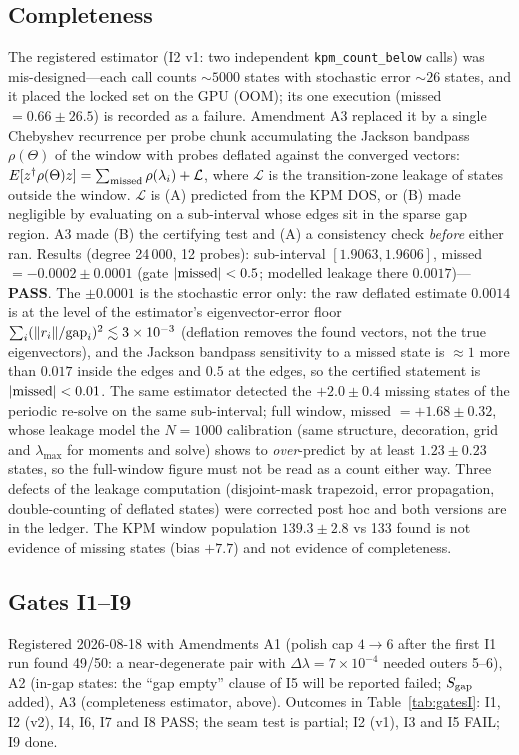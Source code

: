 \documentclass[aps,prl,preprint,superscriptaddress,longbibliography,nofootinbib]{revtex4-2}
\begin{document}
\subsection{Completeness}\label{sec:complete}
The registered estimator (I2 v1: two independent \texttt{kpm\_count\_below} calls) was mis-designed---each call counts $\sim5000$ states with stochastic error $\sim26$ states, and it placed the locked set on the GPU (OOM); its one execution (missed $=0.66\pm26.5$) is recorded as a failure. Amendment A3 replaced it by a single Chebyshev recurrence per probe chunk accumulating the Jackson bandpass $\rho(\Theta)$ of the window with probes deflated against the converged vectors: $E[z^\dagger\rho(\Theta)z]=\sum_{\rm missed}\rho(\lambda_i)+\mathcal L$, where $\mathcal L$ is the transition-zone leakage of states outside the window. $\mathcal L$ is (A) predicted from the KPM DOS, or (B) made negligible by evaluating on a sub-interval whose edges sit in the sparse gap region. A3 made (B) the certifying test and (A) a consistency check \emph{before} either ran. Results (degree 24\,000, 12 probes): sub-interval $[1.9063,1.9606]$, missed $=-0.0002\pm0.0001$ (gate $|{\rm missed}|<0.5$; modelled leakage there $0.0017$)---\textbf{PASS}. The $\pm0.0001$ is the stochastic error only: the raw deflated estimate $0.0014$ is at the level of the estimator's eigenvector-error floor $\sum_i(\|r_i\|/{\rm gap}_i)^2\lesssim3\times10^{-3}$ (deflation removes the found vectors, not the true eigenvectors), and the Jackson bandpass sensitivity to a missed state is $\approx1$ more than $0.017$ inside the edges and $0.5$ at the edges, so the certified statement is $|{\rm missed}|<0.01$. The same estimator detected the $+2.0\pm0.4$ missing states of the periodic re-solve on the same sub-interval; full window, missed $=+1.68\pm0.32$, whose leakage model the $N=1000$ calibration (same structure, decoration, grid and $\lambda_{\max}$ for moments and solve) shows to \emph{over}-predict by at least $1.23\pm0.23$ states, so the full-window figure must not be read as a count either way. Three defects of the leakage computation (disjoint-mask trapezoid, error propagation, double-counting of deflated states) were corrected post hoc and both versions are in the ledger. The KPM window population $139.3\pm2.8$ vs 133 found is not evidence of missing states (bias $+7.7$) and not evidence of completeness.

\subsection{Gates I1--I9}
Registered 2026-08-18 with Amendments A1 (polish cap $4\to6$ after the first I1 run found 49/50: a near-degenerate pair with $\Delta\lambda=7\times10^{-4}$ needed outers 5--6), A2 (in-gap states: the ``gap empty'' clause of I5 will be reported failed; $S_{\rm gap}$ added), A3 (completeness estimator, above). Outcomes in Table~\ref{tab:gatesI}: I1, I2 (v2), I4, I6, I7 and I8 PASS; the seam test is partial; I2 (v1), I3 and I5 FAIL; I9 done.
\end{document}
